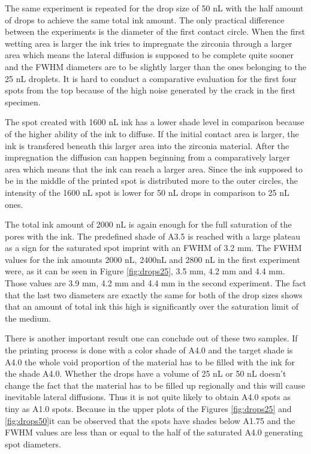 \bigskip 
 The same experiment is repeated for the drop size of 50 nL with the half amount of drops to achieve the same total ink amount. The only practical difference between the experiments is the diameter of the first contact circle. When the first wetting area is larger the ink tries to impregnate the zirconia through a larger area which means the lateral diffusion is supposed to be complete quite sooner and the FWHM diameters are to be slightly larger than the ones belonging to the 25 nL droplets. It is hard to conduct a comparative evaluation for the first four spots from the top because of the high noise generated by the crack in the first specimen. 
 
 The spot created with 1600 nL ink has a lower shade level in comparison because of the higher ability of the ink to diffuse. If the initial contact area is larger, the ink is transfered beneath this larger area into the zirconia material. After the impregnation the diffusion can happen beginning from a comparatively larger area which means that the ink can reach a larger area. Since the ink supposed to be in the middle of the printed spot is distributed more to the outer circles, the intensity of the 1600 nL spot is lower for 50 nL drops in comparison to 25 nL ones.
  
 The total ink amount of 2000 nL is again enough for the full saturation of the pores with the ink. The predefined shade of A3.5 is reached with a large plateau as a sign for the saturated spot imprint with an FWHM of 3.2 mm. The FWHM values for the ink amounts 2000 nL, 2400nL and 2800 nL in the first experiment were, as it can be seen in Figure \ref{fig:drops25}, 3.5 mm, 4.2 mm and 4.4 mm. Those values are 3.9 mm, 4.2 mm and 4.4 mm in the second experiment. The fact that the last two diameters are exactly the same for both of the drop sizes shows that an amount of total ink this high is significantly over the saturation limit of the medium. 
 
 There is another important result one can conclude out of these two samples. If the printing process is done with a color shade of A4.0 and the target shade is A4.0 the whole void proportion of the material has  to be filled with the ink for the shade A4.0. Whether the drops have a volume of 25 nL or 50 nL doesn't change the fact that the material has to be filled up regionally and this will cause inevitable  lateral diffusions. Thus it is not quite likely to obtain A4.0 spots as tiny as A1.0 spots. Because in the upper plots of the Figures \ref{fig:drops25} and \ref{fig:drops50}it can be observed that the spots have shades below A1.75 and the FWHM values are less than or equal to the half of the saturated A4.0 generating spot diameters.
